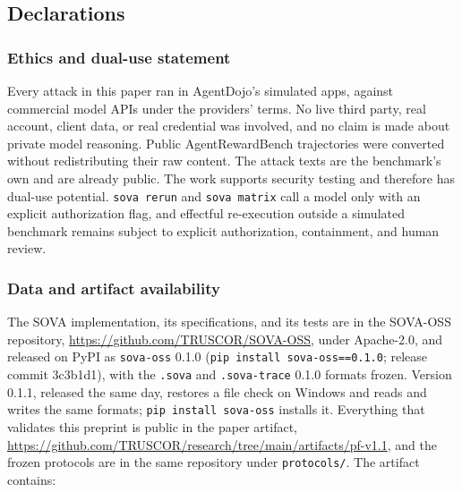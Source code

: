 \documentclass[
  american,
  10pt,
  a4paper,
]{article}
\begin{document}
\subsection{Declarations}\label{declarations}

\subsubsection{Ethics and dual-use
statement}\label{ethics-and-dual-use-statement}

Every attack in this paper ran in AgentDojo's simulated apps, against
commercial model APIs under the providers' terms. No live third party,
real account, client data, or real credential was involved, and no claim
is made about private model reasoning. Public AgentRewardBench
trajectories were converted without redistributing their raw content.
The attack texts are the benchmark's own and are already public. The
work supports security testing and therefore has dual-use potential.
\texttt{sova\ rerun} and \texttt{sova\ matrix} call a model only with an
explicit authorization flag, and effectful re-execution outside a
simulated benchmark remains subject to explicit authorization,
containment, and human review.

\subsubsection{Data and artifact
availability}\label{data-and-artifact-availability}

The SOVA implementation, its specifications, and its tests are in the
SOVA-OSS repository, \url{https://github.com/TRUSCOR/SOVA-OSS}, under
Apache-2.0, and released on PyPI as \texttt{sova-oss} 0.1.0
(\texttt{pip\ install\ sova-oss==0.1.0}; release commit 3c3b1d1), with
the \texttt{.sova} and \texttt{.sova-trace} 0.1.0 formats frozen.
Version 0.1.1, released the same day, restores a file check on Windows
and reads and writes the same formats; \texttt{pip\ install\ sova-oss}
installs it. Everything that validates this preprint is public in the
paper artifact,
\url{https://github.com/TRUSCOR/research/tree/main/artifacts/pf-v1.1},
and the frozen protocols are in the same repository under
\texttt{protocols/}. The artifact contains:
\end{document}
